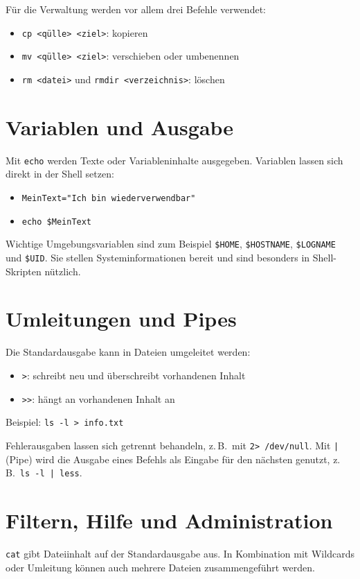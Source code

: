 \documentclass[11pt, oneside, numbers=nönddot]{scrbook}
\begin{document}
Für die Verwaltung werden vor allem drei Befehle verwendet:
\begin{itemize}
\item \texttt{cp <qülle> <ziel>}: kopieren
\item \texttt{mv <qülle> <ziel>}: verschieben oder umbenennen
\item \texttt{rm <datei>} und \texttt{rmdir <verzeichnis>}: löschen
\end{itemize}

\section{Variablen und Ausgabe}
Mit \texttt{echo} werden Texte oder Variableninhalte ausgegeben. Variablen lassen sich direkt in der Shell setzen:
\begin{itemize}
\item \texttt{MeinText="Ich bin wiederverwendbar"}
\item \texttt{echo \$MeinText}
\end{itemize}

Wichtige Umgebungsvariablen sind zum Beispiel \texttt{\$HOME}, \texttt{\$HOSTNAME}, \texttt{\$LOGNAME} und \texttt{\$UID}. Sie stellen Systeminformationen bereit und sind besonders in Shell-Skripten nützlich.

\section{Umleitungen und Pipes}
Die Standardausgabe kann in Dateien umgeleitet werden:
\begin{itemize}
\item \texttt{>}: schreibt neu und überschreibt vorhandenen Inhalt
\item \texttt{>>}: hängt an vorhandenen Inhalt an
\end{itemize}

Beispiel: \texttt{ls -l > info.txt}

Fehlerausgaben lassen sich getrennt behandeln, z.\,B.\ mit \texttt{2> /dev/null}. Mit \texttt{|} (Pipe) wird die Ausgabe eines Befehls als Eingabe für den nächsten genutzt, z.\,B.\ \texttt{ls -l | less}.

\section{Filtern, Hilfe und Administration}
\texttt{cat} gibt Dateiinhalt auf der Standardausgabe aus. In Kombination mit Wildcards oder Umleitung können auch mehrere Dateien zusammengeführt werden.
\end{document}

